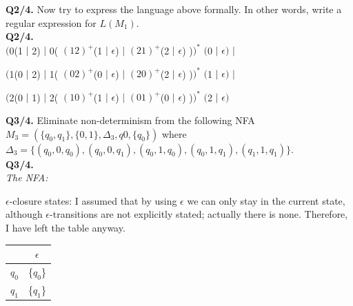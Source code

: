 \documentclass[12pt,a4paper]{article}
\begin{document}
{\noindent \textbf{Q2/4.} Now try to express the language above formally. In other words, write a regular expression for $L(M_1)$.\\

\noindent \textbf{Q2/4.}\\

$\Big($0(1 $|$ 2) $|$ 0( $(12)^{+}$(1 $|$ $\epsilon$) $|$ $(21)^{+}$(2 $|$ $\epsilon$) )$\Big)^{*}$ $\Big($0 $|$ $\epsilon \Big)$ $\Big|$ 

$\Big($1(0 $|$ 2) $|$ 1( $(02)^{+}$(0 $|$ $\epsilon$) $|$ $(20)^{+}$(2 $|$ $\epsilon$) )$\Big)^{*}$ $\Big($1 $|$ $\epsilon \Big)$ $\Big|$

$\Big($2(0 $|$ 1) $|$ 2( $(10)^{+}$(1 $|$ $\epsilon$) $|$ $(01)^{+}$(0 $|$ $\epsilon$) )$\Big)^{*}$ $\Big($2 $|$ $\epsilon \Big)$

\clearpage

\noindent \textbf{Q3/4.} Eliminate non-determinism from the following NFA $M_3 =(\lbrace q_0,q_1\rbrace,\lbrace 0,1\rbrace ,\Delta_3,q0,\lbrace q_0\rbrace)$ where $\Delta_{3} =\lbrace(q_0,0,q_0),(q_0,0,q_1),(q_0,1,q_0),(q_0,1,q_1),(q_1,1,q_1)\rbrace.$\\

\noindent \textbf{Q3/4.}\\
\indent \textit{The NFA:}\\

\noindent
{}

$\epsilon$-closure states: I assumed that by using $\epsilon$ we can only stay in the current state, although $\epsilon$-transitions are not explicitly stated; actually there is none. Therefore, I have left the table anyway. 
\begin{table}[H]
\begin{tabular}{|c|c|}
\hline
     & $\epsilon$ \\ \hline
$q_0$ & \{$q_0$\}  \\ \hline
$q_1$ & \{$q_1$\}  \\ \hline
\end{tabular}
\end{table}


}
\end{document}
